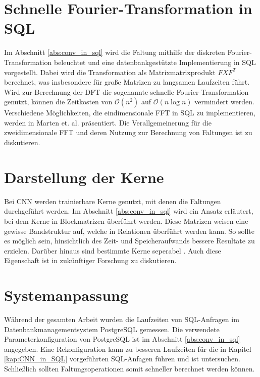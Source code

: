 \section*{Schnelle Fourier-Transformation in SQL}
Im Abschnitt \ref{abs:conv_in_sql} wird die Faltung mithilfe der diskreten Fourier-Transformation beleuchtet und eine datenbankgestützte Implementierung in SQL vorgestellt. Dabei wird die Transformation als Matrixmatrixprodukt $F X F^T$ berechnet, was insbesondere für große Matrizen zu langsamen Laufzeiten führt. Wird zur Berechnung der DFT die sogenannte schnelle Fourier-Transformation genutzt, können die Zeitkosten von $\mathcal{O}(n^2)$ auf $\mathcal{O}(n \log n)$ vermindert werden. Verschiedene Möglichkeiten, die eindimensionale FFT in SQL zu implementieren, werden in Marten et. al.\cite{DBLP:conf/adbis/Marten0019} präsentiert. Die Verallgemeinerung für die zweidimensionale FFT und deren Nutzung zur Berechnung von Faltungen ist zu diskutieren.

\section*{Darstellung der Kerne}
Bei CNN werden trainierbare Kerne genutzt, mit denen die Faltungen durchgeführt werden. Im Abschnitt \ref{abs:conv_in_sql} wird ein Ansatz erläutert, bei dem Kerne in Blockmatrizen überführt werden. Diese Matrizen weisen eine gewisse Bandstruktur auf, welche in Relationen überführt werden kann. So sollte es möglich sein, hinsichtlich des Zeit- und Speicheraufwands bessere Resultate zu erzielen. Darüber hinaus sind bestimmte Kerne seperabel \cite{DBLP:journals/tcas/BaiZH18}. Auch diese Eigenschaft ist in zukünftiger Forschung zu diskutieren.

\section*{Systemanpassung}
Während der gesamten Arbeit wurden die Laufzeiten von SQL-Anfragen im Datenbankmanagementsystem PostgreSQL gemessen. Die verwendete Parameterkonfiguration von PostgreSQL ist im Abschnitt \ref{abs:conv_in_sql} angegeben. Eine Rekonfiguration kann zu besseren Laufzeiten für die in Kapitel \ref{kap:CNN_in_SQL} vorgeführten SQL-Anfagen führen und ist untersuchen. Schließlich sollten Faltungsoperationen somit schneller berechnet werden können.
